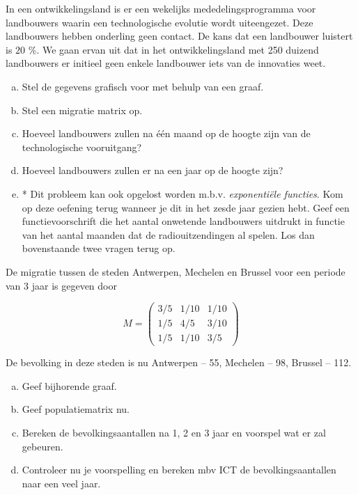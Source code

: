\documentclass[12pt,twoside]{article}
\begin{document}
\begin{oefening}
In een ontwikkelingsland is er een wekelijks mededelingsprogramma voor landbouwers waarin een technologische evolutie wordt uiteengezet. Deze landbouwers hebben onderling geen contact. De kans dat een landbouwer luistert is $20$ \%. We gaan ervan uit dat in het ontwikkelingsland met 250 duizend landbouwers er initieel geen enkele landbouwer iets van de innovaties weet.

\begin{enumerate}[(a)]
  \item Stel de gegevens grafisch voor met behulp van een graaf.
  \item Stel een migratie matrix op.
  \item Hoeveel landbouwers zullen na één maand op de hoogte zijn van de technologische vooruitgang?
  \item Hoeveel landbouwers zullen er na een jaar op de hoogte zijn?
  \item * Dit probleem kan ook opgelost worden m.b.v. {\em exponentiële functies}. Kom op deze oefening terug wanneer je dit in het zesde jaar gezien hebt. Geef een functievoorschrift die het aantal onwetende landbouwers uitdrukt in functie van het aantal maanden dat de radiouitzendingen al spelen. Los dan bovenstaande twee vragen terug op.
\end{enumerate}
\end{oefening}

\begin{oefening}
De migratie tussen de steden Antwerpen, Mechelen en Brussel  voor een periode van 3 jaar
is gegeven door

$$
M = \begin{pmatrix}
  3/5 & 1/10 & 1/10\\
  1/5 & 4/5  & 3/10\\
  1/5 & 1/10 & 3/5
\end{pmatrix}
$$

De bevolking in deze steden is nu Antwerpen – 55, Mechelen – 98, Brussel – 112.

\begin{enumerate}[(a)]
  \item Geef bijhorende graaf.
  \item Geef populatiematrix nu.
  \item Bereken de bevolkingsaantallen na 1, 2 en 3 jaar en voorspel wat er zal gebeuren.
  \item Controleer nu je voorspelling en bereken mbv ICT de bevolkingsaantallen naar een veel jaar.
\end{enumerate}
\end{oefening}
\end{document}
